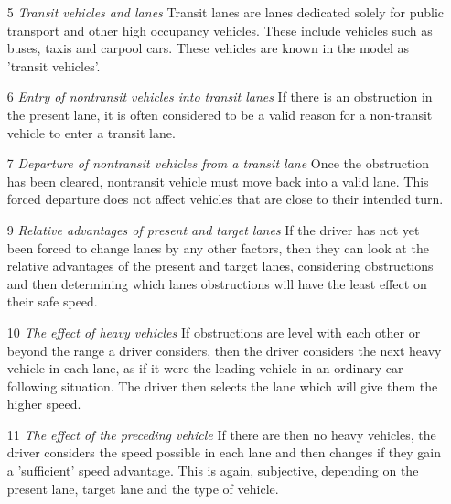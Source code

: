 \begin{enumerate}
\item[5] \textit{Transit vehicles and lanes}
Transit lanes are lanes dedicated solely for public transport and other high occupancy vehicles. These include vehicles such as buses, taxis and carpool cars. These vehicles are known in the model as 'transit vehicles'.
\item[6] \textit{Entry of nontransit vehicles into transit lanes}
If there is an obstruction in the present lane, it is often considered to be a valid reason for a non-transit vehicle to enter a transit lane. 
\item[7] \textit{Departure of nontransit vehicles from a transit lane}
Once the obstruction has been cleared, nontransit vehicle must move back into a valid lane. This forced departure does not affect vehicles that are close to their intended turn.
\item[9] \textit{Relative advantages of present and target lanes}
If the driver has not yet been forced to change lanes by any other factors, then they can look at the relative advantages of the present and target lanes, considering obstructions and then determining which lanes obstructions will have the least effect on their safe speed.
\item[10] \textit{The effect of heavy vehicles} 
If obstructions are level with each other or beyond the range a driver considers, then the driver considers the next heavy vehicle in each lane, as if it were the leading vehicle in an ordinary car following situation. The driver then selects the lane which will give them the higher speed.
\item[11] \textit{The effect of the preceding vehicle}
If there are then no heavy vehicles, the driver considers the speed possible in each lane and then changes if they gain a 'sufficient' speed advantage. This is again, subjective, depending on the present lane, target lane and the type of vehicle.
\end{enumerate}



